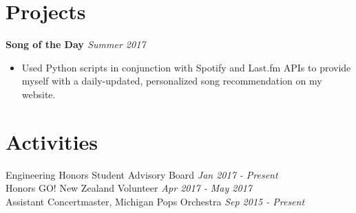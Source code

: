 \documentclass[margin,line]{resume}
\begin{document}
\begin{resume}
	\sectionbreak
	\vspace{-2.5mm}
	\section{\mysidestyle Projects}
	\textbf{Song of the Day \href{https://github.com/jonathoma/songoftheday}{\faGithub}}  \hfill \textsl{Summer 2017} \vspace{1mm}%
	\begin{itemize}[leftmargin=4mm]
		\item Used Python scripts in conjunction with Spotify and Last.fm APIs to provide myself with a daily-updated, personalized song recommendation on my website.
	\end{itemize}
	\vspace{1.5mm}
	   
	\sectionbreak
	\vspace{-2.5mm}
	\section{\mysidestyle Activities}
	\begin{flushright}
		\vspace{-7.5mm}
		Engineering Honors Student Advisory Board	\hfill  \textsl{Jan 2017 - Present} \\
		Honors GO! New Zealand Volunteer \hfill \textsl{Apr 2017 - May 2017} \\
		Assistant Concertmaster, Michigan Pops Orchestra  \hfill \textsl{Sep 2015 - Present}\\
	\end{flushright}
	\vspace{-1.5mm}
	    

\end{resume}
\end{document}
